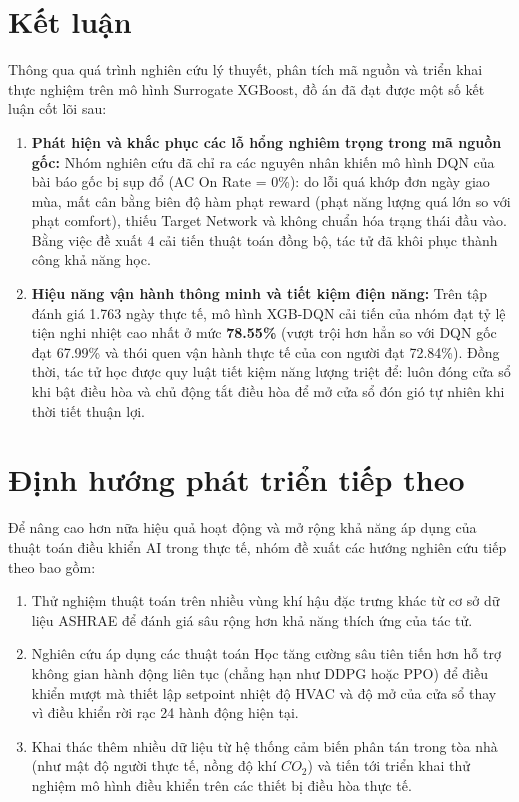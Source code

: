 \documentclass[12pt, a4paper]{report}
\begin{document}
\section{Kết luận}
Thông qua quá trình nghiên cứu lý thuyết, phân tích mã nguồn và triển khai thực nghiệm trên mô hình Surrogate XGBoost, đồ án đã đạt được một số kết luận cốt lõi sau:
\begin{enumerate}
    \item \textbf{Phát hiện và khắc phục các lỗ hổng nghiêm trọng trong mã nguồn gốc:} Nhóm nghiên cứu đã chỉ ra các nguyên nhân khiến mô hình DQN của bài báo gốc bị sụp đổ (AC On Rate = 0\%): do lỗi quá khớp đơn ngày giao mùa, mất cân bằng biên độ hàm phạt reward (phạt năng lượng quá lớn so với phạt comfort), thiếu Target Network và không chuẩn hóa trạng thái đầu vào. Bằng việc đề xuất 4 cải tiến thuật toán đồng bộ, tác tử đã khôi phục thành công khả năng học.
    \item \textbf{Hiệu năng vận hành thông minh và tiết kiệm điện năng:} Trên tập đánh giá 1.763 ngày thực tế, mô hình XGB-DQN cải tiến của nhóm đạt tỷ lệ tiện nghi nhiệt cao nhất ở mức \textbf{78.55\%} (vượt trội hơn hẳn so với DQN gốc đạt 67.99\% và thói quen vận hành thực tế của con người đạt 72.84\%). Đồng thời, tác tử học được quy luật tiết kiệm năng lượng triệt để: luôn đóng cửa sổ khi bật điều hòa và chủ động tắt điều hòa để mở cửa sổ đón gió tự nhiên khi thời tiết thuận lợi.
    
\end{enumerate}

\section{Định hướng phát triển tiếp theo}
Để nâng cao hơn nữa hiệu quả hoạt động và mở rộng khả năng áp dụng của thuật toán điều khiển AI trong thực tế, nhóm đề xuất các hướng nghiên cứu tiếp theo bao gồm:
\begin{enumerate}
    \item Thử nghiệm thuật toán trên nhiều vùng khí hậu đặc trưng khác từ cơ sở dữ liệu ASHRAE để đánh giá sâu rộng hơn khả năng thích ứng của tác tử.
    \item Nghiên cứu áp dụng các thuật toán Học tăng cường sâu tiên tiến hơn hỗ trợ không gian hành động liên tục (chẳng hạn như DDPG hoặc PPO) để điều khiển mượt mà thiết lập setpoint nhiệt độ HVAC và độ mở của cửa sổ thay vì điều khiển rời rạc 24 hành động hiện tại.
    \item Khai thác thêm nhiều dữ liệu từ hệ thống cảm biến phân tán trong tòa nhà (như mật độ người thực tế, nồng độ khí $CO_2$) và tiến tới triển khai thử nghiệm mô hình điều khiển trên các thiết bị điều hòa thực tế.
\end{enumerate}
\end{document}
